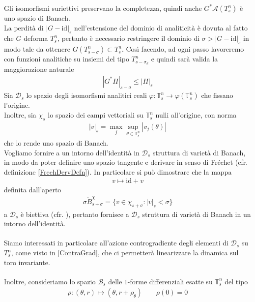 \documentclass[twoside, 11pt]{amsbook}
\newcommand{\0}{{(0)}}
\newcommand{\3}{{(3)}}
\theoremstyle{colonplain}
\theoremstyle{colondefinition}
\theoremstyle{colonremark}
\numberwithin{equation}{chapter}
\begin{document}
Gli isomorfismi suriettivi preservano la completezza, quindi anche $G^*\mathcal{A}(T^n_s)$ è uno spazio di Banach. \\
La perdità di $|G - \mathrm{id}|_s$ nell'estensione del dominio di analiticità è dovuta al fatto che $G$ deforma $T^n_s$, pertanto è necessario restringere il dominio di $\sigma > |G - \mathrm{id}|_s$ in modo tale da ottenere $G(T^n_{s - \sigma}) \subset T^n_s$. Così facendo, ad ogni passo lavoreremo con funzioni analitiche su insiemi del tipo $T^n_{s - \sigma_k}$ e quindi sarà valida la maggiorazione naturale
\begin{align}
    |G^*H|_{s - \sigma} \leq |H|_s
\end{align}
Sia $\mathcal{D}_s$ lo spazio degli isomorfismi analitici reali $\varphi : \mathbb{T}^n_s \longrightarrow \varphi(\mathbb{T}^n_s)$ che fissano l'origine. \\
Inoltre, sia $\chi_s$ lo spazio dei campi vettoriali su $\mathbb{T}^n_s$ nulli all'origine, con norma
\begin{align}
    |v|_s = \max_j \sup_{\theta \in \mathbb{T}^n_s} |v_j(\theta)|
\end{align}
che lo rende uno spazio di Banach. \\
Vogliamo fornire a un intorno dell'identità in $\mathcal{D}_s$ struttura di varietà di Banach, in modo da poter definire uno spazio tangente e derivare in senso di Fréchet (cfr. definizione \cref{FrechDervDefn}). In particolare si può dimostrare che la mappa
\begin{align}
    v \mapsto \mathrm{id} + v
\end{align}
definita dall'aperto
\begin{align}
    \sigma\mathring{B}^\chi_{s + \sigma} = \{v \in \chi_{s + \sigma} : |v|_s < \sigma\}
\end{align}
a $\mathcal{D}_s$ è biettiva (cfr. \cite{Fejoz02}), pertanto fornisce a $\mathcal{D}_s$ struttura di varietà di Banach in un intorno dell'identità. \\ \\
Siamo interessati in particolare all'azione controgradiente degli elementi di $\mathcal{D}_s$ su $T^n_s$, come visto in \eqref{ContraGrad}, che ci permetterà linearizzare la dinamica sul toro invariante. \\ \\
Inoltre, consideriamo lo spazio $\mathcal{B}_s$ delle $1$-forme differenziali esatte su $\mathbb{T}^n_s$ del tipo
\begin{align}
    \rho : (\theta, r) \mapsto (\theta, r + \rho_\theta) \qquad \rho(0) = 0
\end{align}
\end{document}
